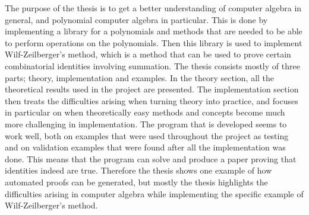 The purpose of the thesis is to get a better understanding of computer algebra in general, and polynomial computer algebra in particular. This is done by implementing a library for a polynomials and methods that are needed to be able to perform operations on the polynomials. Then this library is used to implement Wilf-Zeilberger's method, which is a method that can be used to prove certain combinatorial identities involving summation. The thesis consists mostly of three parts; theory, implementation and examples. In the theory section, all the theoretical results used in the project are presented. The implementation section then treats the difficulties arising when turning theory into practice, and focuses in particular on when theoretically easy methods and concepts become much more challenging in implementation. The program that is developed seems to work well, both on examples that were used throughout the project as testing and on validation examples that were found after all the implementation was done. This means that the program can solve and produce a paper proving that identities indeed are true. Therefore the thesis shows one example of how automated proofs can be generated, but mostly the thesis highlights the difficulties arising in computer algebra while implementing the specific example of Wilf-Zeilberger's method.
